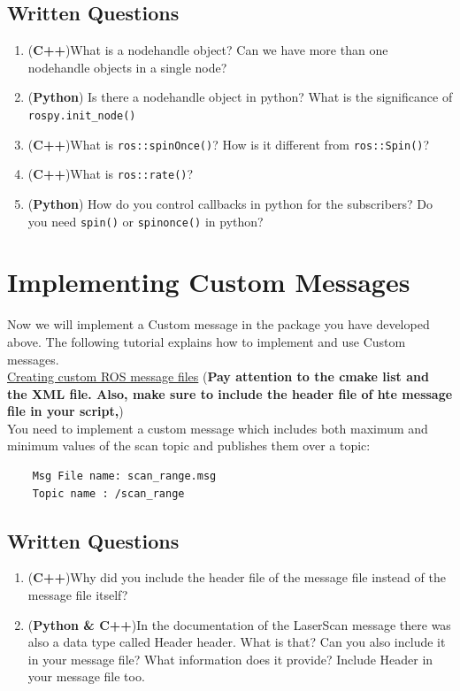 \documentclass[letta4 paper]{article}
\numberwithin{equation}{section}
\newcommand{\0}{\mathbf{0}}
\begin{document}
	\subsection{Written Questions}
	\begin{enumerate}
		\item (\textbf{C++})What is a nodehandle object? Can we have more than one nodehandle objects in a single node? 
		\item (\textbf{Python}) Is there a nodehandle object in python? What is the significance of \texttt{rospy.init\_node()}
		\item (\textbf{C++})What is \texttt{ros::spinOnce()}? How is it different from \texttt{ros::Spin()}?
		\item (\textbf{C++})What is \texttt{ros::rate()}? 
		\item (\textbf{Python}) How do you control callbacks in python for the subscribers? Do you need \texttt{spin()} or \texttt{spinonce()} in python?
	\end{enumerate}{}
			
	\section{ Implementing Custom Messages}
	Now we will implement a Custom message in the package you have developed above. The following tutorial explains how to implement and use Custom messages. \\
	\href{http://wiki.ros.org/ROS/Tutorials/CreatingMsgAndSrv}{ Creating custom ROS message files}
	(\textbf{Pay attention to the cmake list and the XML file. Also, make sure to include the header file of hte message file in your script,})\\
	
	You need to implement a custom message which includes both maximum and minimum values of the scan topic and publishes them over a topic: 
	\begin{lstlisting}
	Msg File name: scan_range.msg
	Topic name : /scan_range
	\end{lstlisting}{}
	
	\subsection{Written Questions}
	\begin{enumerate}
		\item (\textbf{C++})Why did you include the header file of the message file instead of the message file itself?
		\item (\textbf{Python \& C++})In the documentation of the LaserScan message there was also a data type called Header header. What is that? Can you also include it in your message file? What information does it provide? Include Header in your message file too. 
	\end{enumerate}{}
\end{document}
